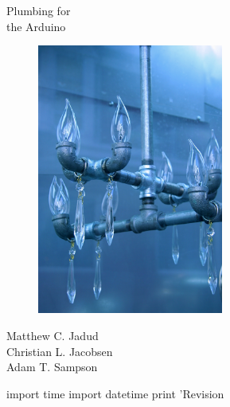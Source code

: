 \ 
\vspace{-3cm}
\fontsize{42}{42}\selectfont 
\begin{center}
\HRule \\
Plumbing for \\
the Arduino\vspace{-1cm}
\HRule
\end{center}

\normalsize

\begin{figure}[bph]
  \begin{center}
    \includegraphics[height=3.5in]{images/cover-light-fixture}
  \end{center}
\end{figure}

\begin{center}
	Matthew C. Jadud\\
	Christian L. Jacobsen\\
	Adam T. Sampson
\end{center}

\thispagestyle{empty}

\newpage

\begin{center}
\vspace*{\fill}
\begin{python}  
	import time
	import datetime
	print 'Revision %
\end{python}
\end{center}

\vspace*{\fill}

\newpage